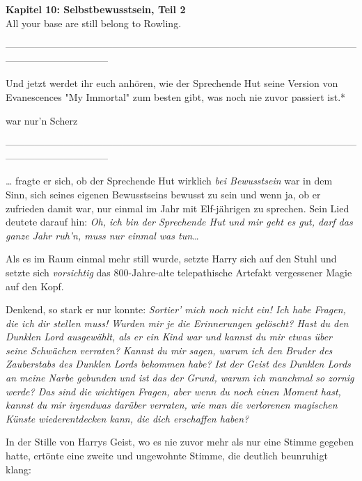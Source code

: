 

\hypertarget{selbstbewusstsein-teil-2}{%

\textbf{Kapitel 10: Selbstbewusstsein, Teil 2}\\

All your base are still belong to Rowling.

--------------------------------------------------------------------------------------------------------------------------------------------

Und jetzt werdet ihr euch anhören, wie der Sprechende Hut seine Version von Evanescences "My Immortal" zum besten gibt, was noch nie zuvor passiert ist.*

war nur'n Scherz

--------------------------------------------------------------------------------------------------------------------------------------------

… fragte er sich, ob der Sprechende Hut wirklich \emph{bei Bewusstsein} war in dem Sinn, sich seines eigenen Bewusstseins bewusst zu sein und wenn ja, ob er zufrieden damit war, nur einmal im Jahr mit Elf-jährigen zu sprechen. Sein Lied deutete darauf hin: \emph{Oh, ich bin der Sprechende Hut und mir geht es gut, darf das ganze Jahr ruh'n, muss nur einmal was tun…}

Als es im Raum einmal mehr still wurde, setzte Harry sich auf den Stuhl und setzte sich \emph{vorsichtig} das 800-Jahre-alte telepathische Artefakt vergessener Magie auf den Kopf.

Denkend, so stark er nur konnte: \emph{Sortier' mich noch nicht ein! Ich habe Fragen, die ich dir stellen muss! Wurden mir je die Erinnerungen gelöscht? Hast du den Dunklen Lord ausgewählt, als er ein Kind war und kannst du mir etwas über seine Schwächen verraten? Kannst du mir sagen, warum ich den Bruder des Zauberstabs des Dunklen Lords bekommen habe? Ist der Geist des Dunklen Lords an meine Narbe gebunden und ist das der Grund, warum ich manchmal so zornig werde? Das sind die wichtigen Fragen, aber wenn du noch einen Moment hast, kannst du mir irgendwas darüber verraten, wie man die verlorenen magischen Künste wiederentdecken kann, die dich erschaffen haben?}

In der Stille von Harrys Geist, wo es nie zuvor mehr als nur eine Stimme gegeben hatte, ertönte eine zweite und ungewohnte Stimme, die deutlich beunruhigt klang:

}

